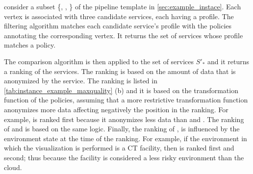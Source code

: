 \begin{example}
  consider a subset \{, , \} of the pipeline template \tChartFunction in \cref{sec:example_instace}.
  Each vertex is associated with three candidate services, each having a profile. The filtering algorithm matches each candidate service's profile with the policies annotating the corresponding vertex. It returns the set of services whose profile matches a policy.

  The comparison algorithm is then applied to the set of services $S'_*$ and it returns a ranking of the services.
  The ranking is based on the amount of data that is anonymized by the service.
  The ranking is listed in \cref{tab:instance_example_maxquality} (b) and it is based on the transformation function of the policies,
  assuming that a more restrictive transformation function anonymizes more data affecting negatively the position in the ranking.
  For example,  is ranked first because it anonymizes less data than  and .
  The ranking of  and  is based on the same logic.
  Finally, the ranking of ,  is influenced by the environment state at the time of the ranking.
  For example, if the environment in which the visualization is performed is a CT facility, then  is ranked first and  second;
  thus because the facility is considered a less risky environment than the cloud.

\end{example}


